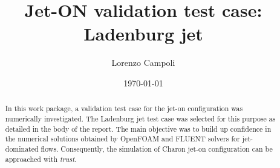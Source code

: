 \documentclass[12pt]{article}
\title{Jet-ON validation test case: Ladenburg jet}
\author{Lorenzo Campoli}
\date{\today}
\begin{document}
\setmainfont{Arial}

\maketitle

\renewcommand{\arraystretch}{1.5} %
\setlength{\tabcolsep}{8pt}       %

\begin{center}
\end{center}

\begin{abstract}
\noindent In this work package, a validation test case for the jet-on configuration was numerically investigated. The Ladenburg jet test case was selected for this purpose as detailed in the body of the report. The main objective was to build up confidence in the numerical solutions obtained by OpenFOAM and FLUENT solvers for jet-dominated flows. Consequently, the simulation of Charon jet-on configuration can be approached with \textit{trust}. 
\end{abstract}

%

\tableofcontents
\end{document}
